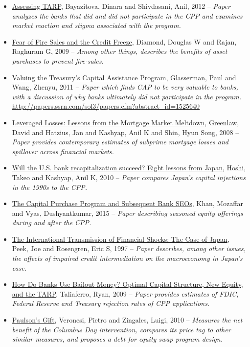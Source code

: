 \documentclass[12pt]{article}
\begin{document}
\begin{itemize}
\item
\ul{Assessing TARP},
Bayazitova, Dinara and Shivdasani, Anil, 2012 -- \emph{Paper analyzes the banks that did and did not participate in the CPP and examines market reaction and stigma associated with the program.}
\item
\ul{Fear of Fire Sales and the Credit Freeze},
Diamond, Douglas W and Rajan, Raghuram G, 2009 -- \emph{Among other things, describes the benefits of asset purchases to prevent fire-sales.}
\item
\ul{Valuing the Treasury's Capital Assistance Program},
Glasserman, Paul and Wang, Zhenyu, 2011 -- \emph{Paper
which finds CAP to be very valuable to banks, with a discussion of why banks ultimately did not participate in the program.} \url{http://papers.ssrn.com/sol3/papers.cfm?abstract_id=1525640}
\item
\ul{Leveraged Losses: Lessons from the Mortgage Market Meltdown},
Greenlaw, David and Hatzius, Jan and Kashyap, Anil K and Shin, Hyun Song, 2008 -- \emph{Paper provides contemporary estimates of subprime mortgage losses and spillover across financial markets.}
\item
\ul{Will the U.S. bank recapitalization succeed? Eight lessons from Japan},
Hoshi, Takeo and Kashyap, Anil K, 2010 -- \emph{Paper compares Japan's capital injections in the 1990s to the CPP.}
\item
\ul{The Capital Purchase Program and Subsequent Bank SEOs},
Khan, Mozaffar and Vyas, Dushyantkumar, 2015 -- \emph{Paper describing seasoned equity offerings during and after the CPP.}
\item
\ul{The International Transmission of Financial Shocks: The Case of Japan},
Peek, Joe and Rosengren, Eric S, 1997 -- \emph{Paper describes, among other issues, the affects of impaired credit intermediation on the macroeconomy in Japan's case.}
\item
\ul{How Do Banks Use Bailout Money? Optimal Capital Structure, New Equity, and the TARP},
Taliaferro, Ryan, 2009 -- \emph{Paper provides estimates of FDIC, Federal Reserve and Treasury rejection rates of CPP applications.}
\item
\ul{Paulson's Gift},
Veronesi, Pietro and Zingales, Luigi, 2010 -- \emph{Measures the net benefit of the Columbus Day intervention, compares its price tag to other similar measures, and proposes a debt for equity swap program design.}
\end{itemize}
\end{document}

